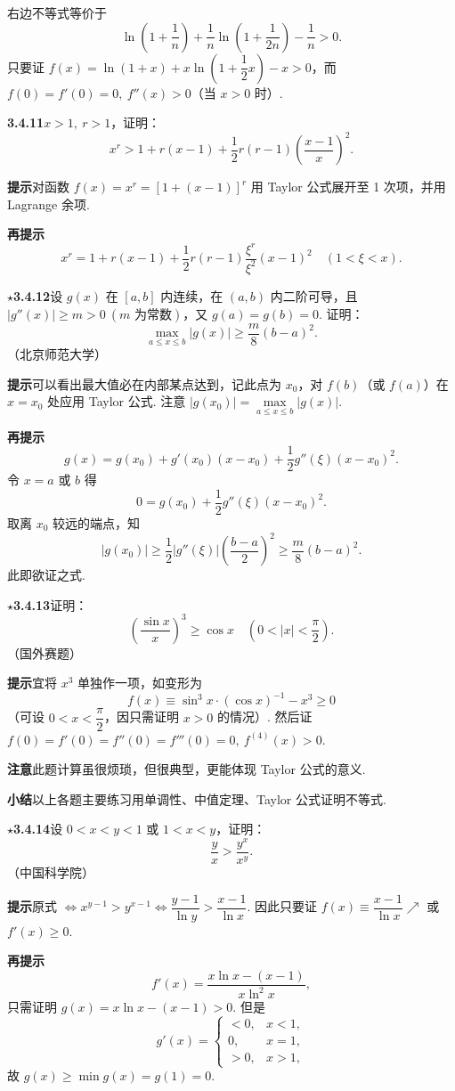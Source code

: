 \documentclass[UTF8, 12pt, fontset=fandol, oneside]{ctexart}
\begin{document}
右边不等式等价于
\[
  \ln\left(1+\frac1n\right)+\frac1n\ln\left(1+\frac1{2n}\right)-\frac1n>0.
\]
只要证 $f(x)=\ln(1+x)+x\ln\left(1+\dfrac12x\right)-x>0$，而 $f(0)=f'(0)=0,\ f''(x)>0$（当 $x>0$ 时）.

\noindent\textbf{3.4.11}\quad $x>1,\ r>1$，证明：
\[
  x^r>1+r(x-1)+\frac12r(r-1)\left(\frac{x-1}{x}\right)^2.
\]

\noindent\textbf{提示}\quad 对函数 $f(x)=x^r=[1+(x-1)]^r$ 用 Taylor 公式展开至 1 次项，并用 Lagrange 余项.

\noindent\textbf{再提示}\quad
\[
  x^r=1+r(x-1)+\frac12r(r-1)\frac{\xi^r}{\xi^2}(x-1)^2\quad(1<\xi<x).
\]

\noindent\textbf{$\star$3.4.12}\quad 设 $g(x)$ 在 $[a,b]$ 内连续，在 $(a,b)$ 内二阶可导，且 $|g''(x)|\ge m>0\ (m\text{ 为常数})$，又 $g(a)=g(b)=0$. 证明：
\[
  \max_{a\le x\le b}|g(x)|\ge\frac m8(b-a)^2.
\]
（北京师范大学）

\noindent\textbf{提示}\quad 可以看出最大值必在内部某点达到，记此点为 $x_0$，对 $f(b)$（或 $f(a)$）在 $x=x_0$ 处应用 Taylor 公式. 注意 $|g(x_0)|=\max\limits_{a\le x\le b}|g(x)|$.

\noindent\textbf{再提示}\quad
\[
  g(x)=g(x_0)+g'(x_0)(x-x_0)+\frac12g''(\xi)(x-x_0)^2.
\]
令 $x=a$ 或 $b$ 得
\[
  0=g(x_0)+\frac12g''(\xi)(x-x_0)^2.
\]
取离 $x_0$ 较远的端点，知
\[
  |g(x_0)|\ge\frac12|g''(\xi)|\left(\frac{b-a}2\right)^2
  \ge\frac m8(b-a)^2.
\]
此即欲证之式.

\noindent\textbf{$\star$3.4.13}\quad 证明：
\[
  \left(\frac{\sin x}{x}\right)^3\ge \cos x\quad\left(0<|x|<\frac\pi2\right).
\]
（国外赛题）

\noindent\textbf{提示}\quad 宜将 $x^3$ 单独作一项，如变形为
\[
  f(x)\equiv\sin^3x\cdot(\cos x)^{-1}-x^3\ge0
\]
（可设 $0<x<\dfrac\pi2$，因只需证明 $x>0$ 的情况）. 然后证 $f(0)=f'(0)=f''(0)=f'''(0)=0,\ f^{(4)}(x)>0$.

\noindent\textbf{注意}\quad 此题计算虽很烦琐，但很典型，更能体现 Taylor 公式的意义.

\noindent\textbf{小结}\quad 以上各题主要练习用单调性、中值定理、Taylor 公式证明不等式.

\noindent\textbf{$\star$3.4.14}\quad 设 $0<x<y<1$ 或 $1<x<y$，证明：
\[
  \frac yx>\frac{y^x}{x^y}.
\]
（中国科学院）

\noindent\textbf{提示}\quad 原式 $\Leftrightarrow x^{y-1}>y^{x-1}\Leftrightarrow\dfrac{y-1}{\ln y}>\dfrac{x-1}{\ln x}$. 因此只要证 $f(x)\equiv\dfrac{x-1}{\ln x}\nearrow$ 或 $f'(x)\ge0$.

\noindent\textbf{再提示}\quad
\[
  f'(x)=\frac{x\ln x-(x-1)}{x\ln^2x},
\]
只需证明 $g(x)=x\ln x-(x-1)>0$. 但是
\[
g'(x)=
\begin{cases}
<0, & x<1,\\
0, & x=1,\\
>0, & x>1,
\end{cases}
\]
故 $g(x)\ge \min g(x)=g(1)=0$.
\end{document}
